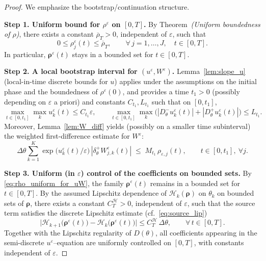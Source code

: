 \documentclass[11pt, dina4, amsfont12]{article}
\begin{document}
\begin{proof}
We emphasize the bootstrap/continuation structure.

\medskip
\noindent
\textbf{Step 1. Uniform bound for $\rho^\varepsilon$ on $[0,T]$.}
By Theorem~\emph{(Uniform boundedness of $\rho$)}, there exists a constant
$\overline \rho_T>0$, independent of $\varepsilon$, such that
\begin{equation}\label{eq:rho_uniform_for_uW}
0\le \rho_j^\varepsilon(t)\le \overline\rho_T,
\qquad
\forall\, j=1,\dots,J,\quad t\in[0,T].
\end{equation}
In particular, $\boldsymbol\rho^\varepsilon(t)$ stays in a bounded set for
$t\in[0,T]$.

\medskip
\noindent
\textbf{Step 2. A local bootstrap interval for $(u^\varepsilon,W^\varepsilon)$.}
Lemma~\ref{lem:slope_u} (local-in-time discrete bounds for $u$) applies under the
assumptions on the initial phase and the boundedness of $\rho^\varepsilon(0)$,
and provides a time $t_1>0$ (possibly depending on $\varepsilon$ a priori) and
constants $C_{t_1},L_{t_1}$ such that on $[0,t_1]$,
\[
\max_{t\in[0,t_1]}\max_k u_k^\varepsilon(t)\le C_{t_1}\varepsilon,
\qquad
\max_{t\in[0,t_1]}\max_k\Big(|D_\theta^-u_k^\varepsilon(t)|+|D_\theta^+u_k^\varepsilon(t)|\Big)\le L_{t_1}.
\]
Moreover, Lemma~\ref{lem:W_diff} yields (possibly on a smaller time subinterval)
the weighted first-difference estimate for $W^\varepsilon$:
\[
\Delta\theta\sum_{k=1}^K
\exp\!\big(u_k^\varepsilon(t)/\varepsilon\big)\,|\delta_\theta^+ W_{j,k}^\varepsilon(t)|
\;\le\;
M_{t_1}\,\rho_{\varepsilon,j}(t),
\qquad t\in[0,t_1],\ \forall j.
\]

\medskip
\noindent
\textbf{Step 3. Uniform (in $\varepsilon$) control of the coefficients on bounded sets.}
By \eqref{eq:rho_uniform_for_uW}, the family $\boldsymbol\rho^\varepsilon(t)$ remains
in a bounded set for $t\in[0,T]$. By the assumed Lipschitz dependence of
$\mathcal H_k(\boldsymbol\rho)$ on $\theta_k$ on bounded sets of $\boldsymbol\rho$,
there exists a constant $C_T^{\mathcal H}>0$, independent of $\varepsilon$, such that
the source term satisfies the discrete Lipschitz estimate (cf.~\eqref{eq:source_lip})
\begin{equation}\label{eq:source_lip_on_0T}
\bigl|
\mathcal H_{k+1}\bigl(\boldsymbol\rho^\varepsilon(t)\bigr)
-\mathcal H_{k}\bigl(\boldsymbol\rho^\varepsilon(t)\bigr)
\bigr|
\le C_T^{\mathcal H}\,\Delta\theta,
\qquad \forall\, t\in[0,T].
\end{equation}
Together with the Lipschitz regularity of $D(\theta)$, all coefficients appearing in
the semi-discrete $u^\varepsilon$--equation are uniformly controlled on $[0,T]$,
with constants independent of $\varepsilon$.


\end{proof}
\end{document}
